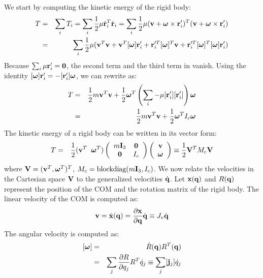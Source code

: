 We start by computing the kinetic energy of the rigid body:
\begin{eqnarray}
\label{eq:rigid_kinetic}
T &=& \sum_i T_i = \sum_i \frac{1}{2}  \mathbf{\mu} \dot{\mathbf{r}}_i^{T}
    \dot{\mathbf{r}}_i = \sum_i \frac{1}{2}  \mathbf{\mu} (\mathbf{v} + \bm{\omega}
    \times \mathbf{r}_i')^T (\mathbf{v} + \boldsymbol{\bm{\omega}}
    \times \mathbf{r}_i') \nonumber \\
 &=& \sum_i \frac{1}{2}  \mathbf{\mu} (\mathbf{v}^T\mathbf{v} +
    \mathbf{v}^T [\bm{\omega}] \mathbf{r}_i' + \mathbf{r}_i'^T [\bm{\omega}]^T \mathbf{v} +
    \mathbf{r}_i'^T [\bm{\omega}]^T [\bm{\omega}] \mathbf{r}_i')
\end{eqnarray}
Because $\sum_i \mathbf{\mu}
\mathbf{r}_i' = \mathbf{0}$, the second term and the third term in  vanish. Using the identity $[\bm{\omega}]\mathbf{r}_i' =
-[\mathbf{r}_i']\bm{\omega}$, we can rewrite 
as:
\begin{eqnarray}
\nonumber
T & = & \frac{1}{2} m \mathbf{v}^T\mathbf{v} + \frac{1}{2} \bm{\omega}^T \left ( \sum_i -\mathbf{\mu}
 [\mathbf{r}_i'][\mathbf{r}_i'] \right ) \bm{\omega}\\
 & = & \frac{1}{2} m \mathbf{v}^T\mathbf{v} + \frac{1}{2} \bm{\omega}^T I_c \bm{\omega}
\end{eqnarray}
The kinetic energy of a rigid body can be written in its vector form:
\begin{eqnarray}
\label{eq:kinetic_vec}
T &=& \frac{1}{2} (\mathbf{v}^T \;\; \bm{\omega}^T)
\left(
\begin{array}{cc}
m\mathbf{I}_3 & \mathbf{0} \\
\mathbf{0} & I_c
\end{array}
\right)
\left(
\begin{array}{c}
\mathbf{v} \\
\bm{\omega} 
\end{array}
\right)
 \equiv \frac{1}{2}\mathbf{V}^T M_c \mathbf{V}
\end{eqnarray}
where $\mathbf{V} = (\mathbf{v}^T,\bm{\omega}^T)^T$, $M_c = \mbox{blockdiag}(m\mathbf{I}_3,I_c)$. We now relate the velocities in the Cartesian space $\mathbf{V}$ to the generalized velocities $\dot{\mathbf{q}}$. Let $\mathbf{x}(\mathbf{q})$ and $R(\mathbf{q})$ represent the position of the COM and the rotation matrix of the rigid body. The linear velocity of the COM is computed as:
\begin{eqnarray}
\label{eq:vellin}
\mathbf{v} = \dot{\mathbf{x}}(\mathbf{q}) = \frac{\partial \mathbf{x}}{\partial \mathbf{q}} \dot{\mathbf{q}} \equiv J_v \dot{\mathbf{q}}
\end{eqnarray}
The angular velocity is computed as:
\begin{eqnarray}
\nonumber
[\bm{\omega}] & = & \dot{R}(\mathbf{q})R^T(\mathbf{q}) \\
\label{eq:Jaccolj}
& = & \sum_j \frac{\partial R}{\partial q_j}R^T \dot{q}_j \equiv \sum_j [\mathbf{j}_{j}] \dot{q}_j
\end{eqnarray}
